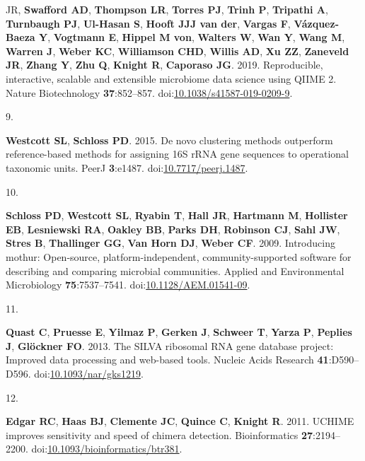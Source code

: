 \documentclass[
]{article}
\newlength{\cslhangindent}
\newlength{\csllabelwidth}
\newlength{\cslentryspacingunit} %
\newenvironment{CSLReferences}[2] %
 {%
  \setlength{\parindent}{0pt}
  \ifodd #1
  \let\oldpar\par
  \def\par{\hangindent=\cslhangindent\oldpar}
  \fi
  \setlength{\parskip}{#2\cslentryspacingunit}
 }%
 {}
\newcommand{\CSLLeftMargin}[1]{\parbox[t]{\csllabelwidth}{#1}}
\newcommand{\CSLRightInline}[1]{\parbox[t]{\linewidth - \csllabelwidth}{#1}\break}
\begin{document}
\begin{CSLReferences}{0}{1}
{{JR}, \textbf{Swafford AD}, \textbf{Thompson LR}, \textbf{Torres PJ},
\textbf{Trinh P}, \textbf{Tripathi A}, \textbf{Turnbaugh PJ},
\textbf{Ul-Hasan S}, \textbf{Hooft JJJ van der}, \textbf{Vargas F},
\textbf{Vázquez-Baeza Y}, \textbf{Vogtmann E}, \textbf{Hippel M von},
\textbf{Walters W}, \textbf{Wan Y}, \textbf{Wang M}, \textbf{Warren J},
\textbf{Weber KC}, \textbf{Williamson CHD}, \textbf{Willis AD},
\textbf{Xu ZZ}, \textbf{Zaneveld JR}, \textbf{Zhang Y}, \textbf{Zhu Q},
\textbf{Knight R}, \textbf{Caporaso JG}. 2019. Reproducible,
interactive, scalable and extensible microbiome data science using QIIME
2. Nature Biotechnology \textbf{37}:852--857.
doi:\href{https://doi.org/10.1038/s41587-019-0209-9}{10.1038/s41587-019-0209-9}.}

\leavevmode{}%
\CSLLeftMargin{9. }%
\CSLRightInline{\textbf{Westcott SL}, \textbf{Schloss PD}. 2015. De novo
clustering methods outperform reference-based methods for assigning 16S
rRNA gene sequences to operational taxonomic units. PeerJ
\textbf{3}:e1487.
doi:\href{https://doi.org/10.7717/peerj.1487}{10.7717/peerj.1487}.}

\leavevmode{}%
\CSLLeftMargin{10. }%
\CSLRightInline{\textbf{Schloss PD}, \textbf{Westcott SL},
\textbf{Ryabin T}, \textbf{Hall JR}, \textbf{Hartmann M},
\textbf{Hollister EB}, \textbf{Lesniewski RA}, \textbf{Oakley BB},
\textbf{Parks DH}, \textbf{Robinson CJ}, \textbf{Sahl JW}, \textbf{Stres
B}, \textbf{Thallinger GG}, \textbf{Van Horn DJ}, \textbf{Weber CF}.
2009. Introducing mothur: Open-source, platform-independent,
community-supported software for describing and comparing microbial
communities. Applied and Environmental Microbiology
\textbf{75}:7537--7541.
doi:\href{https://doi.org/10.1128/AEM.01541-09}{10.1128/AEM.01541-09}.}

\leavevmode{}%
\CSLLeftMargin{11. }%
\CSLRightInline{\textbf{Quast C}, \textbf{Pruesse E}, \textbf{Yilmaz P},
\textbf{Gerken J}, \textbf{Schweer T}, \textbf{Yarza P}, \textbf{Peplies
J}, \textbf{Glöckner FO}. 2013. The SILVA ribosomal RNA gene database
project: Improved data processing and web-based tools. Nucleic Acids
Research \textbf{41}:D590--D596.
doi:\href{https://doi.org/10.1093/nar/gks1219}{10.1093/nar/gks1219}.}

\leavevmode{}%
\CSLLeftMargin{12. }%
\CSLRightInline{\textbf{Edgar RC}, \textbf{Haas BJ}, \textbf{Clemente
JC}, \textbf{Quince C}, \textbf{Knight R}. 2011. UCHIME improves
sensitivity and speed of chimera detection. Bioinformatics
\textbf{27}:2194--2200.
doi:\href{https://doi.org/10.1093/bioinformatics/btr381}{10.1093/bioinformatics/btr381}.}


\end{CSLReferences}
\end{document}
